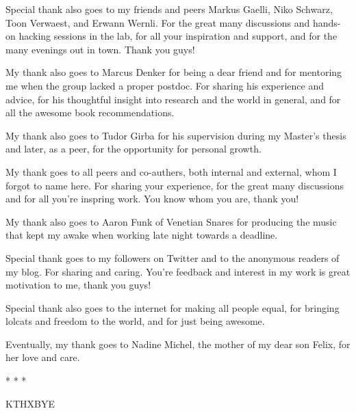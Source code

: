 Special thank also goes to my friends and peers Markus Gaelli, Niko Schwarz, Toon Verwaest, and Erwann Wernli. For the great many discussions and hands-on hacking sessions in the lab, for all your inspiration and support, and for the many evenings out in town.  Thank you guys!

My thank also goes to Marcus Denker for being a dear friend and for mentoring me when the group lacked a proper postdoc. For sharing his experience and advice, for his thoughtful insight into research and the world in general, and for all the awesome book recommendations. 

My thank also goes to Tudor Girba for his supervision during my Master's thesis and later, as a peer, for the opportunity for personal growth.

My thank goes to all peers and co-authers, both internal and external, whom I forgot to name here. For sharing your experience, for the great many discussions and for all you're inspring work. You know whom you are, thank you!

My thank also goes to Aaron Funk of Venetian Snares for producing the music that kept my awake when working late night towards a deadline. 

Special thank goes to my followers on Twitter and to the anonymous readers of my blog. For sharing and caring. You're feedback and interest in my work is great motivation to me, thank you guys!

Special thank also goes to the internet for making all people equal, for bringing lolcats and freedom to the world, and for just being awesome.

Eventually, my thank goes to Nadine Michel, the mother of my dear son Felix, for her love and care. 

\begin{center}* * *\end{center}

KTHXBYE